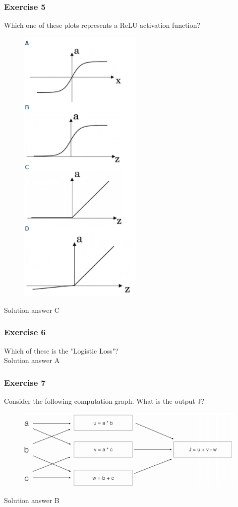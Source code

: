 \subsubsection{Exercise 5}
Which one of these plots represents a ReLU activation function?
\begin{figure}[htbp]
    \centering
    \includegraphics[width=6cm]{ExerciseBook/01-NeuralNetwork/exercise5.png}\newline
\end{figure}
Solution answer C
\subsubsection{Exercise 6}
Which of these is the "Logistic Loss"?\\
Solution answer A
\subsubsection{Exercise 7}
Consider the following computation graph. What is the output J?
\begin{figure}[htbp]
    \centering
    \includegraphics[width=12cm]{ExerciseBook/01-NeuralNetwork/exercise7.png}\newline
\end{figure}
Solution answer B
